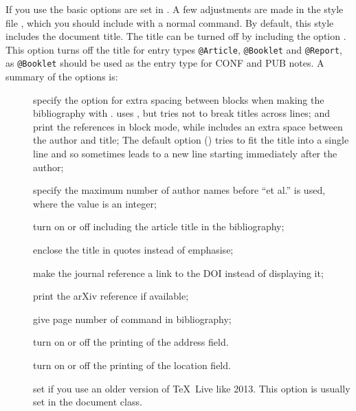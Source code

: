 \documentclass[UKenglish, texlive=2016]{\ATLASLATEXPATH atlasdoc}
\begin{document}
If you use  the basic options are set in .
A few adjustments are made in the style file ,
which you should include with a normal  command.
By default, this style includes the document title.
The title can be turned off by including the option .
This option turns off the title for entry types \texttt{@Article}, \texttt{@Booklet} and \texttt{@Report},
as \texttt{@Booklet} should be used as the entry type for CONF and PUB notes.
A summary of the options is:
\begin{description}
\item[] specify the option for extra spacing between blocks when making the bibliography with .
   uses , but tries not to break titles across lines;
   and  print the references in block mode, while  includes an extra space between the author and title;
  The default option () tries to fit the title into a single line
  and so sometimes leads to a new line starting immediately after the author;
\item[] specify the maximum number of author names before \enquote{et al.} is used, where the value is an integer;
\item[] turn on or off including the article title in the bibliography;
\item[] enclose the title in quotes instead of emphasise;
\item[] make the journal reference a link to the DOI instead of displaying it;
\item[] print the arXiv reference if available;
\item[] give page number of  command in bibliography;
\item[] turn on or off the printing of the address field.
\item[] turn on or off the printing of the location field.
\item[] set if you use an older version of \TeX\ Live like 2013.
  This option is usually set in the document class.
\end{description}
\end{document}
